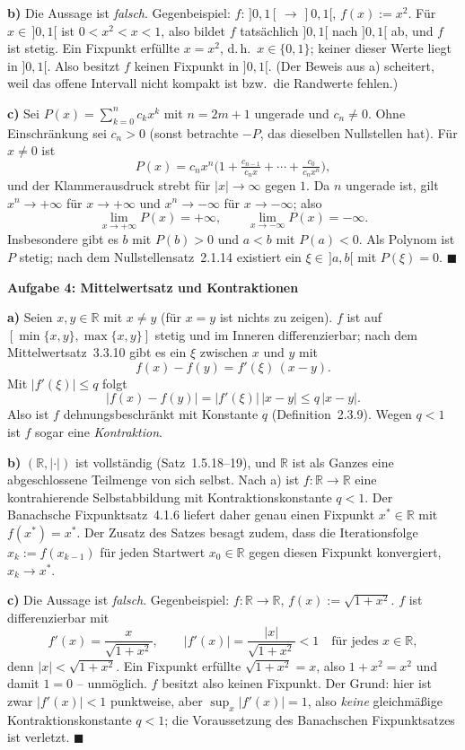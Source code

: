 \documentclass[a4paper,12pt]{article}
\providecommand{\qed}{\hfill\ensuremath{\blacksquare}}
\newcommand{\aufgabe}[2]{%
  \bigskip\par\noindent\textbf{Aufgabe #1: #2}\par\nobreak\medskip}
\begin{document}
\textbf{b)} Die Aussage ist \emph{falsch}. Gegenbeispiel: $f:\,]0,1[\,\to\,]0,1[$, $f(x):=x^2$. Für $x\in\,]0,1[$ ist $0<x^2<x<1$, also bildet $f$ tatsächlich $]0,1[$ nach $]0,1[$ ab, und $f$ ist stetig. Ein Fixpunkt erfüllte $x=x^2$, d.\,h.\ $x\in\{0,1\}$; keiner dieser Werte liegt in $]0,1[$. Also besitzt $f$ keinen Fixpunkt in $]0,1[$. (Der Beweis aus a) scheitert, weil das offene Intervall nicht kompakt ist bzw.\ die Randwerte fehlen.)

\textbf{c)} Sei $P(x)=\sum_{k=0}^{n} c_k x^k$ mit $n=2m+1$ ungerade und $c_n\neq 0$. Ohne Einschränkung sei $c_n>0$ (sonst betrachte $-P$, das dieselben Nullstellen hat). Für $x\neq 0$ ist
\[ P(x)=c_n x^{n}\Big(1+\tfrac{c_{n-1}}{c_n x}+\cdots+\tfrac{c_0}{c_n x^{n}}\Big), \]
und der Klammerausdruck strebt für $|x|\to\infty$ gegen $1$. Da $n$ ungerade ist, gilt $x^{n}\to+\infty$ für $x\to+\infty$ und $x^{n}\to-\infty$ für $x\to-\infty$; also
\[ \lim_{x\to+\infty}P(x)=+\infty,\qquad \lim_{x\to-\infty}P(x)=-\infty. \]
Insbesondere gibt es $b$ mit $P(b)>0$ und $a<b$ mit $P(a)<0$. Als Polynom ist $P$ stetig; nach dem Nullstellensatz~2.1.14 existiert ein $\xi\in\,]a,b[$ mit $P(\xi)=0$. \qed

\aufgabe{4}{Mittelwertsatz und Kontraktionen}

\textbf{a)} Seien $x,y\in\mathbb{R}$ mit $x\neq y$ (für $x=y$ ist nichts zu zeigen). $f$ ist auf $[\min\{x,y\},\max\{x,y\}]$ stetig und im Inneren differenzierbar; nach dem Mittelwertsatz~3.3.10 gibt es ein $\xi$ zwischen $x$ und $y$ mit
\[ f(x)-f(y)=f'(\xi)\,(x-y). \]
Mit $|f'(\xi)|\le q$ folgt
\[ |f(x)-f(y)|=|f'(\xi)|\,|x-y|\le q\,|x-y|. \]
Also ist $f$ dehnungsbeschränkt mit Konstante $q$ (Definition~2.3.9). Wegen $q<1$ ist $f$ sogar eine \emph{Kontraktion}.

\textbf{b)} $(\mathbb{R},|\cdot|)$ ist vollständig (Satz~1.5.18--19), und $\mathbb{R}$ ist als Ganzes eine abgeschlossene Teilmenge von sich selbst. Nach a) ist $f:\mathbb{R}\to\mathbb{R}$ eine kontrahierende Selbstabbildung mit Kontraktionskonstante $q<1$. Der Banachsche Fixpunktsatz~4.1.6 liefert daher genau einen Fixpunkt $x^\ast\in\mathbb{R}$ mit $f(x^\ast)=x^\ast$. Der Zusatz des Satzes besagt zudem, dass die Iterationsfolge $x_k:=f(x_{k-1})$ für jeden Startwert $x_0\in\mathbb{R}$ gegen diesen Fixpunkt konvergiert, $x_k\to x^\ast$.

\textbf{c)} Die Aussage ist \emph{falsch}. Gegenbeispiel: $f:\mathbb{R}\to\mathbb{R}$, $f(x):=\sqrt{1+x^2}$. $f$ ist differenzierbar mit
\[ f'(x)=\frac{x}{\sqrt{1+x^2}},\qquad |f'(x)|=\frac{|x|}{\sqrt{1+x^2}}<1\quad\text{für jedes }x\in\mathbb{R}, \]
denn $|x|<\sqrt{1+x^2}$. Ein Fixpunkt erfüllte $\sqrt{1+x^2}=x$, also $1+x^2=x^2$ und damit $1=0$ -- unmöglich. $f$ besitzt also keinen Fixpunkt. Der Grund: hier ist zwar $|f'(x)|<1$ punktweise, aber $\sup_{x}|f'(x)|=1$, also \emph{keine} gleichmäßige Kontraktionskonstante $q<1$; die Voraussetzung des Banachschen Fixpunktsatzes ist verletzt. \qed
\end{document}
